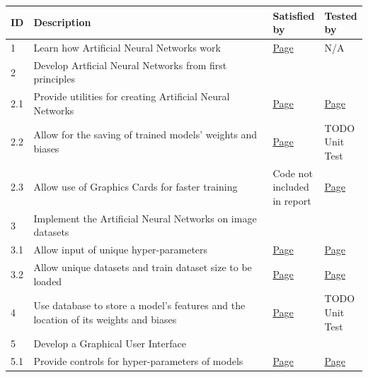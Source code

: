 \documentclass[./project-report/src/latex/project-report.tex]{subfiles}
\begin{document}
\begin{tabular}{|p{0.03\linewidth}|p{0.73\linewidth}|p{0.12\linewidth}|p{0.12\linewidth}|}
      \hline
      \textbf{ID} & \textbf{Description} & \textbf{Satisfied by} & \textbf{Tested by} \\
      \hline
      1 & Learn how Artificial Neural Networks work & \hyperref[sec:ann-theory]{Page \pageref{sec:ann-theory}} & N/A \\
      \hline
      2 & Develop Artficial Neural Networks from first principles & & \\
      \hline
      2.1 & Provide utilities for creating Artificial Neural Networks & \hyperref[sec:utils-subpackage]{Page \pageref{sec:utils-subpackage}} & \hyperref[sec:unit-tests]{Page \pageref{sec:unit-tests}} \\
      \hline
      2.2 & Allow for the saving of trained models' weights and biases & \hyperref[sec:model-module]{Page \pageref{sec:model-module}} & TODO Unit Test \\
      \hline
      2.3 & Allow use of Graphics Cards for faster training & Code not included in report & \hyperref[sec:cpu-vs-gpu-analysis]{Page \pageref{sec:cpu-vs-gpu-analysis}} \\
      \hline
      3 & Implement the Artificial Neural Networks on image datasets & & \\
      \hline
      3.1 & Allow input of unique hyper-parameters & \hyperref[sec:ann-implementations]{Page \pageref{sec:ann-implementations}} & \hyperref[sec:effects-of-hyper-parameters]{Page \pageref{sec:effects-of-hyper-parameters}} \\
      \hline
      3.2 & Allow unique datasets and train dataset size to be loaded & \hyperref[sec:ann-implementations]{Page \pageref{sec:ann-implementations}} & \hyperref[sec:train-dataset-size-analysis]{Page \pageref{sec:train-dataset-size-analysis}} \\
      \hline
      4 & Use database to store a model's features and the location of its weights and biases & \hyperref[sec:__main__-module]{Page \pageref{sec:__main__-module}} & TODO Unit Test \\
      \hline
      5 & Develop a Graphical User Interface & & \\
      \hline
      5.1 & Provide controls for hyper-parameters of models & \hyperref[sec:create_model-module]{Page \pageref{sec:create_model-module}} & \hyperref[sec:hyper-parameter-frame-input-validation]{Page \pageref{sec:hyper-parameter-frame-input-validation}} \\  %

\end{tabular}
\end{document}

